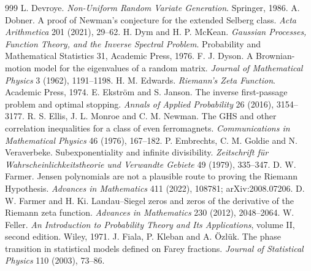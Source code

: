 \begin{thebibliography}{999}
 L. Devroye. \emph{Non-Uniform Random Variate Generation}. Springer, 1986.
 A. Dobner. A proof of Newman's conjecture for the extended Selberg class. \emph{Acta Arithmetica} 201 (2021), 29--62.
 H. Dym and H. P. McKean. \emph{Gaussian Processes, Function Theory, and the Inverse Spectral Problem}. Probability and Mathematical Statistics 31, Academic Press, 1976.
 F. J. Dyson. A Brownian-motion model for the eigenvalues of a random matrix. \emph{Journal of Mathematical Physics} 3 (1962), 1191--1198.
 H. M. Edwards. \emph{Riemann's Zeta Function}. Academic Press, 1974.
 E. Ekstr\"om and S. Janson. The inverse first-passage problem and optimal stopping. \emph{Annals of Applied Probability} 26 (2016), 3154--3177.
 R. S. Ellis, J. L. Monroe and C. M. Newman. The GHS and other correlation inequalities for a class of even ferromagnets. \emph{Communications in Mathematical Physics} 46 (1976), 167--182.
 P. Embrechts, C. M. Goldie and N. Veraverbeke. Subexponentiality and infinite divisibility. \emph{Zeitschrift f\"ur Wahrscheinlichkeitstheorie und Verwandte Gebiete} 49 (1979), 335--347.
 D. W. Farmer. Jensen polynomials are not a plausible route to proving the Riemann Hypothesis. \emph{Advances in Mathematics} 411 (2022), 108781; arXiv:2008.07206.
 D. W. Farmer and H. Ki. Landau--Siegel zeros and zeros of the derivative of the Riemann zeta function. \emph{Advances in Mathematics} 230 (2012), 2048--2064.
 W. Feller. \emph{An Introduction to Probability Theory and Its Applications}, volume II, second edition. Wiley, 1971.
 J. Fiala, P. Kleban and A. \"Ozl\"uk. The phase transition in statistical models defined on Farey fractions. \emph{Journal of Statistical Physics} 110 (2003), 73--86.

\end{thebibliography}

